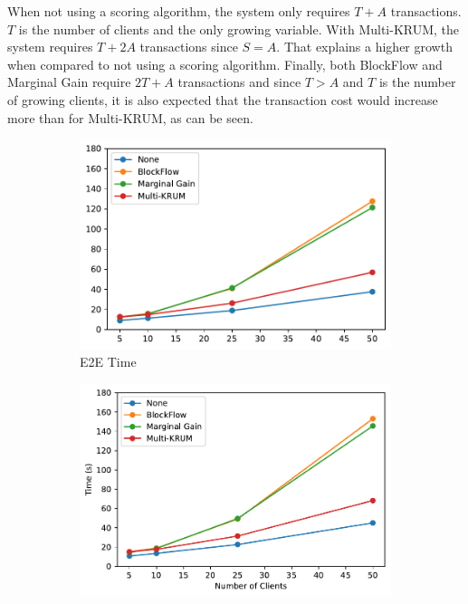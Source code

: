 When not using a scoring algorithm, the system only requires $T+A$ transactions. $T$ is the number of clients and the only growing variable. With Multi-KRUM, the system requires $T+2A$ transactions since $S=A$. That explains a higher growth when compared to not using a scoring algorithm. Finally, both BlockFlow and Marginal Gain require $2T+A$ transactions and since $T > A$ and $T$ is the number of growing clients, it is also expected that the transaction cost would increase more than for Multi-KRUM, as can be seen.

\begin{figure}[!ht]
    \centering
    \begin{subfigure}[b]{0.49\textwidth}
        \centering
        \includegraphics[width=\textwidth]{graphics/clients/e2e.pdf}
        \caption{E2E Time}
    \end{subfigure}
    \hfill
    \begin{subfigure}[b]{0.49\textwidth}
        \centering
        \includegraphics[width=\textwidth]{graphics/clients/round.pdf}

\end{subfigure}
\end{figure}
